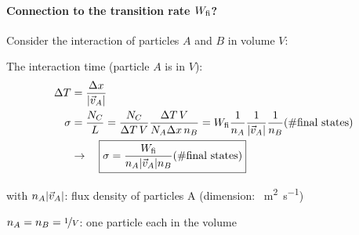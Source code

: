 \paragraph{Connection to the transition rate $W_{\mathrm{fi}}$?}
Consider the interaction of particles $A$ and $B$ in volume $V$:
\begin{center}
\end{center}
The interaction time (particle $A$ is in $V$):
\begin{align}
    \Delta T & = \frac{\Delta x}{\qty|\vec v_A|} \nonumber \\
    \sigma & = \frac{N_C}{L} = \frac{N_C}{\Delta T\, V}\frac{\Delta T \, V}{N_A \Delta x \, n_B} = W_{\mathrm{fi}} \frac{1}{n_A} \frac{1}{\qty|\vec v_A|} \frac{1}{n_B} \qty(\# \text{final states}) \nonumber \\
    & \rightarrow \quad \boxed{\sigma = \frac{W_{\mathrm{fi}}}{n_A \qty|\vec v_A| n_B} \qty(\# \text{final states}) }
\end{align}
\begin{compactitem}
    \item[with] $n_A \qty|\vec v_A|$: flux density of particles A (dimension: \si{\per \square \meter \per \second})
    \item[] $n_A = n_B = \nicefrac 1V$: one particle each in the volume
\end{compactitem}

